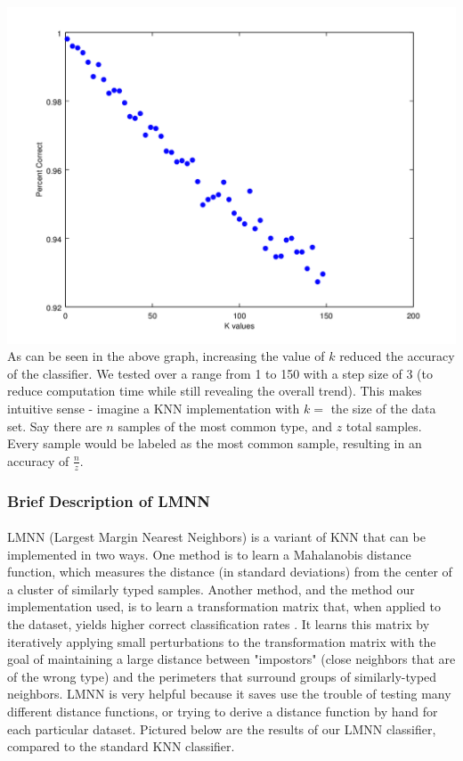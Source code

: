 \documentclass[11pt]{article}
\begin{document}
\paragraph{}
\includegraphics[scale=.66]{kValuesGraph.png}
\\
As can be seen in the above graph, increasing the value of $k$ reduced the accuracy of the classifier. We tested over a range from 1 to 150 with a step size of 3 (to reduce computation time while still revealing the overall trend). This makes intuitive sense - imagine a KNN implementation with $k = $ the size of the data set. Say there are $n$ samples of the most common type, and $z$ total samples. Every sample would be labeled as the most common sample, resulting in an accuracy of $\frac{n}{z}$.
\subsubsection{Brief Description of LMNN}
\paragraph{}
LMNN (Largest Margin Nearest Neighbors) is a variant of KNN that can be implemented in two ways. One method is to learn a Mahalanobis distance function, which measures the distance (in standard deviations) from the center of a cluster of similarly typed samples. Another method, and the method our implementation used, is to learn a transformation matrix that, when applied to the dataset, yields higher correct classification rates \cite{huyen12}. It learns this matrix by iteratively applying small perturbations to the transformation matrix with the goal of maintaining a large distance between "impostors" (close neighbors that are of the wrong type) and the perimeters that surround groups of similarly-typed neighbors. LMNN is very helpful because it saves use the trouble of testing many different distance functions, or trying to derive a distance function by hand for each particular dataset. Pictured below are the results of our LMNN classifier, compared to the standard KNN classifier.
\end{document}

